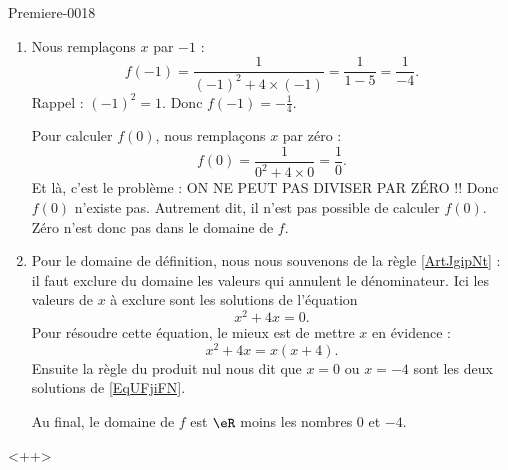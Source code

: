 
\begin{corrige}{Premiere-0018}

    \begin{enumerate}
        \item
            Nous remplaçons \( x\) par \( -1\) :
            \begin{equation}
                f(-1)=\frac{1}{ (-1)^2+4\times (-1) }=\frac{1}{ 1-5 }=\frac{1}{ -4 }.
            \end{equation}
            Rappel : \( (-1)^2=1\). Donc \( f(-1)=-\frac{1}{ 4 }\).

            Pour calculer \( f(0)\), nous remplaçons \( x\) par zéro :
            \begin{equation}
                f(0)=\frac{1}{  0^2+4\times 0 }=\frac{1}{ 0 }.
            \end{equation}
            Et là, c'est le problème : ON NE PEUT PAS DIVISER PAR ZÉRO !! Donc \( f(0)\) n'existe pas. Autrement dit, il n'est pas possible de calculer \( f(0)\). Zéro n'est donc pas dans le domaine de \( f\).

        \item
            Pour le domaine de définition, nous nous souvenons de la règle \ref{ArtJgipNt} : il faut exclure du domaine les valeurs qui annulent le dénominateur. Ici les valeurs de \( x\) à exclure sont les solutions de l'équation
            \begin{equation}    \label{EqUFjiFN}
                x^2+4x=0.
            \end{equation}
            Pour résoudre cette équation, le mieux est de mettre \( x\) en évidence :
            \begin{equation}
                x^2+4x=x(x+4).
            \end{equation}
            Ensuite la règle du produit nul nous dit que \( x=0\) ou \( x=-4\) sont les deux solutions de \eqref{EqUFjiFN}.

            Au final, le domaine de \( f\) est \( \eR\) moins les nombres \( 0\) et \( -4\).
    \end{enumerate}
    <++>

\end{corrige}
